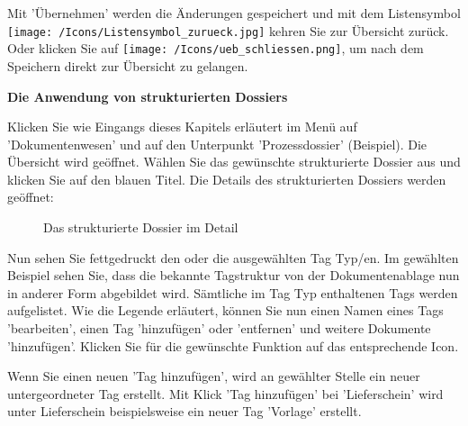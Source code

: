 Mit 'Übernehmen' werden die Änderungen gespeichert und mit dem Listensymbol \texttt{[image: /Icons/Listensymbol\_zurueck.jpg]} kehren Sie zur Übersicht zurück. Oder klicken Sie auf \texttt{[image: /Icons/ueb\_schliessen.png]}, um nach dem Speichern direkt zur Übersicht zu gelangen.

\vspace{.5cm}

\textbf{Die Anwendung von strukturierten Dossiers}

Klicken Sie wie Eingangs dieses Kapitels erläutert im Menü auf 'Dokumentenwesen' und auf den Unterpunkt 'Prozessdossier' (Beispiel). Die Übersicht wird geöffnet. Wählen Sie das gewünschte strukturierte Dossier aus und klicken Sie auf den blauen Titel. Die Details des strukturierten Dossiers werden geöffnet:

\begin{figure}[H]
\caption{Das strukturierte Dossier im Detail}
\end{figure}

Nun sehen Sie fettgedruckt den oder die ausgewählten Tag Typ/en. Im gewählten Beispiel sehen Sie, dass die bekannte Tagstruktur von der Dokumentenablage nun in anderer Form abgebildet wird. Sämtliche im Tag Typ enthaltenen Tags werden aufgelistet. Wie die Legende erläutert, können Sie nun einen Namen eines Tags 'bearbeiten', einen Tag 'hinzufügen' oder 'entfernen' und weitere Dokumente 'hinzufügen'. Klicken Sie für die gewünschte Funktion auf das entsprechende Icon.

\vspace{\baselineskip}

Wenn Sie einen neuen 'Tag hinzufügen', wird an gewählter Stelle ein neuer untergeordneter Tag erstellt. Mit Klick 'Tag hinzufügen' bei 'Lieferschein' wird unter Lieferschein beispielsweise ein neuer Tag 'Vorlage' erstellt.

\vspace{\baselineskip}

